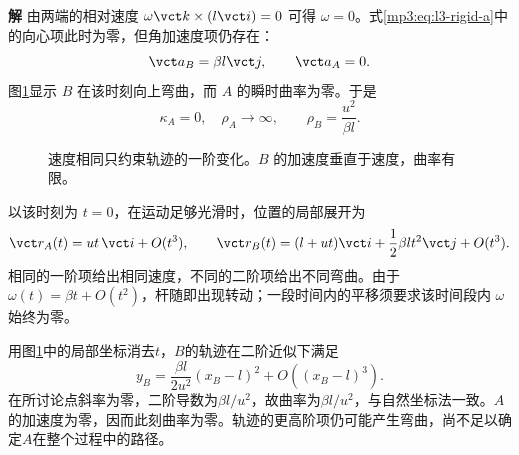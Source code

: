 \documentclass[11pt,openany,fontset=fandol]{ctexbook}
\theoremstyle{definition}\newtheorem{example}{例}[chapter]\newtheorem{exercise}{习题}[chapter]
\newcommand{\SolutionStart}{\par\medskip\ifdim\pagetotal>0pt\ifdim\dimexpr\pagegoal-\pagetotal\relax<3\baselineskip\newpage\fi\fi\noindent\textbf{解}\quad\ignorespaces}
\newenvironment{solution}{\SolutionStart}{\par\medskip}
\begin{document}
\begin{solution}
由两端的相对速度 $\omega\vct k\times(l\vct i)=0$ 可得 $\omega=0$。式\eqref{mp3:eq:l3-rigid-a}中的向心项此时为零，但角加速度项仍存在：
\[
\vct a_B=\beta l\vct j,\qquad \vct a_A=0.
\]
图\ref{mp3:fig:l3-p6-s}显示 $B$ 在该时刻向上弯曲，而 $A$ 的瞬时曲率为零。于是
\[
\kappa_A=0,\quad \rho_A\to\infty,\qquad
\rho_B=\frac{u^2}{\beta l}.
\]

\begin{figure}[H]\centering
{}
\caption{速度相同只约束轨迹的一阶变化。$B$ 的加速度垂直于速度，曲率有限。}\label{mp3:fig:l3-p6-s}
\end{figure}


以该时刻为 $t=0$，在运动足够光滑时，位置的局部展开为
\[
\vct r_A(t)=ut\,\vct i+O(t^3),\qquad
\vct r_B(t)=(l+ut)\vct i+\frac12\beta l t^2\vct j+O(t^3).
\]
相同的一阶项给出相同速度，不同的二阶项给出不同弯曲。由于 $\omega(t)=\beta t+O(t^2)$，杆随即出现转动；一段时间内的平移须要求该时间段内 $\omega$ 始终为零。

用图\ref{mp3:fig:l3-p6-s}中的局部坐标消去$t$，$B$的轨迹在二阶近似下满足
\[
 y_B=\frac{\beta l}{2u^2}(x_B-l)^2+O((x_B-l)^3).
\]
在所讨论点斜率为零，二阶导数为$\beta l/u^2$，故曲率为$\beta l/u^2$，与自然坐标法一致。$A$的加速度为零，因而此刻曲率为零。轨迹的更高阶项仍可能产生弯曲，尚不足以确定$A$在整个过程中的路径。
\end{solution}
\end{document}
